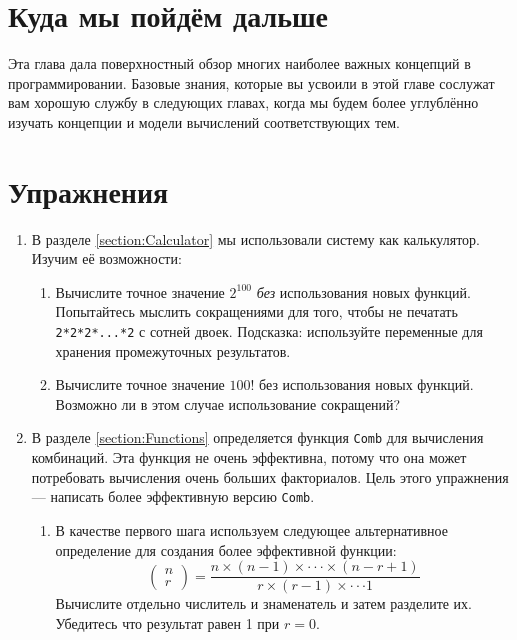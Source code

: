 \section{Куда мы пойдём дальше}

Эта глава дала поверхностный обзор многих наиболее важных концепций в программировании. Базовые знания, которые вы усвоили в этой главе сослужат вам хорошую службу в следующих главах, когда мы будем более углублённо изучать концепции и модели вычислений соответствующих тем.

\section{Упражнения}

\begin{enumerate}
\item{В разделе \ref{section:Calculator} мы использовали систему как калькулятор. Изучим её возможности:
  \begin{enumerate}
  \item{Вычислите точное значение $2^{100}$ \emph{без} использования новых функций. Попытайтесь мыслить сокращениями для того, чтобы не печатать \lstinline|2*2*2*...*2| с сотней двоек. Подсказка: используйте переменные для хранения промежуточных результатов.}
  \item{Вычислите точное значение $100!$ без использования новых функций. Возможно ли в этом случае использование сокращений?}
  \end{enumerate}
}

\item{В разделе \ref{section:Functions} определяется функция \lstinline|Comb| для вычисления комбинаций. Эта функция не очень эффективна, потому что она может потребовать вычисления очень больших факториалов. Цель этого упражнения --- написать более эффективную версию \lstinline|Comb|.

  \begin{enumerate}

  \item{В качестве первого шага используем следующее альтернативное определение для создания более эффективной функции:
    $$
    \begin{pmatrix}
      n \\
      r
    \end{pmatrix}
    =
    \frac{n \times (n - 1) \times \cdot \cdot \cdot \times (n - r +1)}{r \times (r - 1) \times \cdot \cdot \cdot 1}
    $$
    Вычислите отдельно числитель и знаменатель и затем разделите их. Убедитесь что результат равен 1 при $r = 0$.
  }


\end{enumerate}}
\end{enumerate}
